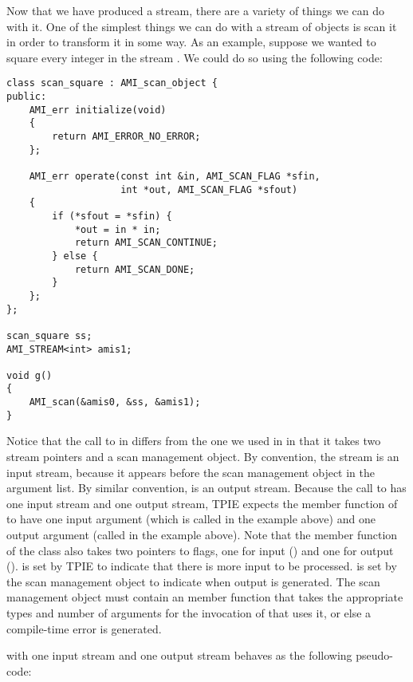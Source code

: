 Now that we have produced a stream, there are a variety of things we
can do with it.  One of the simplest things we can do with a stream of
objects is scan it in order to transform it in some way.  As an
example, suppose we wanted to square every integer in the stream
.  We could do so using the following code:

\begin{verbatim}
class scan_square : AMI_scan_object {
public:
    AMI_err initialize(void)
    {
        return AMI_ERROR_NO_ERROR;
    };

    AMI_err operate(const int &in, AMI_SCAN_FLAG *sfin,
                    int *out, AMI_SCAN_FLAG *sfout)
    {
        if (*sfout = *sfin) {
            *out = in * in;
            return AMI_SCAN_CONTINUE;
        } else {
            return AMI_SCAN_DONE;
        }
    };
};

scan_square ss;
AMI_STREAM<int> amis1;    

void g() 
{
    AMI_scan(&amis0, &ss, &amis1);
}
\end{verbatim}

Notice that the call to  in 
differs from the one we used in  in that it
takes two stream pointers and a scan management object.  By
convention, the stream  is an input stream,
because it appears before the scan management object
 in the argument list.  By similar convention,
 is an output stream.  Because the call to
 has one input stream and one output
stream, TPIE expects the  member function
of  to have one input argument (which is called
 in the example above) and one output argument
(called  in the example above).  Note that the
 member function of the class
 also takes two pointers to flags, one
for input () and one for output
().   is set by TPIE to indicate
that there is more input to be processed.  
is set by the scan management object to indicate when output
is generated.  The scan management object must contain an
 member function that takes the
appropriate types and number of arguments for the invocation
of  that uses it, or else a compile-time
error is generated.

 with one input stream and one output stream
behaves as the following pseudo-code:

